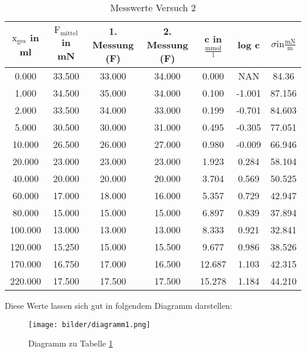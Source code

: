         \begin{table}[H]
            \centering
            \caption{Messwerte Versuch 2}
            \label{tab:Versuch2_Ergebnisse}
            \vspace{0.8em}
            \begin{tabular}{|c|c|c|c|c|c|c|}
                \hline
                $\mathrm{x_{ges}}$ in ml & $\mathrm{F_{mittel}}$ in mN & 1. Messung (F) & 2. Messung (F) & c in $\frac{\mathrm{mmol}}{\mathrm{l}}$ & log c & $\sigma \mathrm{ in } \frac{\mathrm{mN}}{\mathrm{m}}$ \\ 
                \hline
                0.000 & 33.500 & 33.000 & 34.000 & 0.000 & NAN & 84.36 \\
                \hline
                1.000 & 34.500 & 35.000 & 34.000 & 0.100 & -1.001 & 87.156 \\
                \hline
                2.000 & 33.500 & 34.000 & 33.000 & 0.199 & -0.701 & 84.603 \\
                \hline
                5.000 & 30.500 & 30.000 & 31.000 & 0.495 & -0.305 & 77.051 \\ 
                \hline
                10.000 & 26.500 & 26.000 & 27.000 & 0.980 & -0.009 & 66.946 \\
                \hline
                20.000 & 23.000 & 23.000 & 23.000 & 1.923 & 0.284 & 58.104 \\
                \hline
                40.000 & 20.000 & 20.000 & 20.000 & 3.704 & 0.569 & 50.525 \\
                \hline
                60.000 & 17.000 & 18.000 & 16.000 & 5.357 & 0.729 & 42.947\\
                \hline
                80.000 & 15.000 & 15.000 & 15.000 & 6.897 & 0.839 & 37.894\\
                \hline
                100.000 & 13.000 & 13.000 & 13.000 &  8.333 & 0.921 & 32.841\\

                \hline
                120.000 & 15.250 & 15.000 & 15.500 & 9.677 & 0.986 & 38.526\\
                \hline
                170.000 & 16.750 & 17.000 & 16.500 & 12.687 & 1.103 & 42.315\\
                \hline
                220.000 & 17.500 & 17.500 & 17.500 & 15.278 & 1.184 & 44.210\\
                \hline
            \end{tabular}
        \end{table}
        Diese Werte lassen sich gut in folgendem Diagramm darstellen:
        \begin{figure}[H]
            \centering
            \caption{Diagramm zu Tabelle \ref{tab:Versuch2_Ergebnisse}}
            \label{fig:versuch2}
            \texttt{[image: bilder/diagramm1.png]}
        \end{figure}

